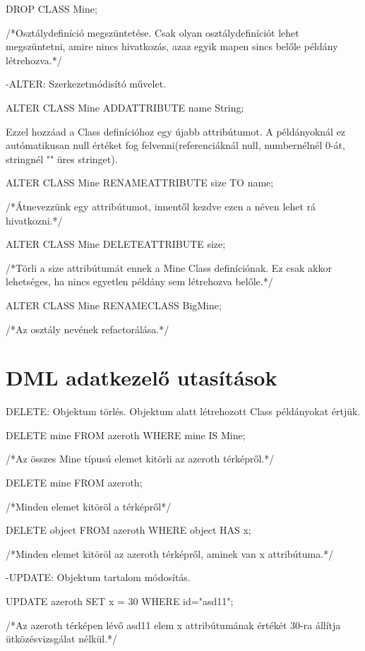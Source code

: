 \begin{sql}
\begin{sql}
DROP CLASS Mine;
\end{sql}
/*Osztálydefiníció megszüntetése. Csak olyan osztálydefiníciót lehet megszüntetni, amire nincs hivatkozás, azaz egyik mapen sincs belőle példány létrehozva.*/

-ALTER: Szerkezetmódisító művelet. 
\begin{sql}
ALTER CLASS Mine ADDATTRIBUTE name String;
\end{sql}
Ezzel hozzáad a Class definícióhoz egy újabb attribútumot. A példányoknál ez autómatikusan null értéket fog felvenni(referenciáknál null, numbernélnél 0-át, stringnél "" üres stringet).

\begin{sql}
ALTER CLASS Mine RENAMEATTRIBUTE size TO name;
\end{sql}
/*Átnevezzünk egy attribútumot, innentől kezdve ezen a néven lehet rá hivatkozni.*/

\begin{sql}
ALTER CLASS Mine DELETEATTRIBUTE size;
\end{sql}
/*Törli a size attribútumát ennek a Mine Class definíciónak. Ez csak akkor lehetséges, ha nincs egyetlen példány sem létrehozva belőle.*/

\begin{sql}
ALTER CLASS Mine RENAMECLASS BigMine;
\end{sql}
/*Az osztály nevének refactorálása.*/

\section{DML adatkezelő utasítások}

DELETE: Objektum törlés. Objektum alatt létrehozott Class példányokat értjük.

\begin{sql}
DELETE mine FROM azeroth WHERE  mine IS Mine;
\end{sql}
/*Az összes Mine típusú elemet kitörli az azeroth térképről.*/
\begin{sql}
DELETE mine FROM azeroth;
\end{sql}
/*Minden elemet kitöröl a térképről*/
\begin{sql}
DELETE object FROM azeroth WHERE object HAS x;
\end{sql}
/*Minden elemet kitöröl az azeroth térképről, aminek van x attribútuma.*/

-UPDATE: Objektum tartalom módosítás.
\begin{sql}
UPDATE azeroth SET x = 30 WHERE id="asd11";
\end{sql}
/*Az azeroth térképen lévő asd11 elem x attribútumának értékét 30-ra állítja ütközésvizsgálat nélkül.*/


\end{sql}
